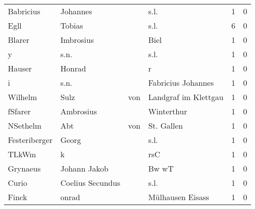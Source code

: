 \begin{tabular}{llllrr}
                Babricius &                           Johannes &             &                                        s.l. &          1 &         0 \\
                     Egll &                             Tobias &             &                                        s.l. &          6 &         0 \\
                   Blarer &                          Imbrosius &             &                                        Biel &          1 &         0 \\
                        y &                               s.n. &             &                                        s.l. &          1 &         0 \\
                   Hauser &                             Honrad &             &                                           r &          1 &         0 \\
                        i &                               s.n. &             &                          Fabricius Johannes &          1 &         0 \\
                  Wilhelm &                               Sulz &         von &                        Landgraf im Klettgau &          1 &         0 \\
                  fSfarer &                          Ambrosius &             &                                  Winterthur &          1 &         0 \\
                 NSethelm &                                Abt &         von &                                  St. Gallen &          1 &         0 \\
            Festeriberger &                              Georg &             &                                        s.l. &          1 &         0 \\
                    TLkWm &                                  k &             &                                         rsC &          1 &         0 \\
                 Grynaeus &                       Johann Jakob &             &                                       Bw wT &          1 &         0 \\
                    Curio &                   Coelius Secundus &             &                                        s.l. &          1 &         0 \\
                    Finck &                              onrad &             &                            Mülhausen Eisass &          1 &         0 \\

\end{tabular}
